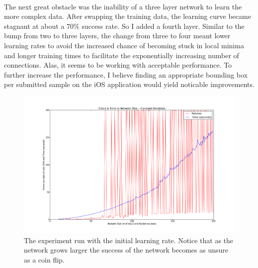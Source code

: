 \documentclass{article}
\begin{document}
    \paragraph{}The next great obstacle was the inability of a three layer network
    to learn the more complex data. After swapping the training data, the learning
    curve became stagnant at about a 70\% success rate. So I added a fourth layer.
    Similar to the bump from two to three layers, the change from three to four 
    meant lower learning rates to avoid the increased chance of becoming stuck in 
    local minima and longer training times to facilitate the exponentially 
    increasing number of connections. Alas, it seems to be working with acceptable
    performance. To further increase the performance, I believe finding an 
    appropriate bounding box per submitted sample on the iOS application would 
    yield noticable improvements.

    \begin{figure}
        \centering
        \includegraphics[scale=0.4]{images/bad_learning.png}
        \caption{The experiment run with the initial learning rate. Notice that
            as the network grows larger the success of the network becomes as
            unsure as a coin flip.}
        \label{badgraph}
    \end{figure}
\end{document}
